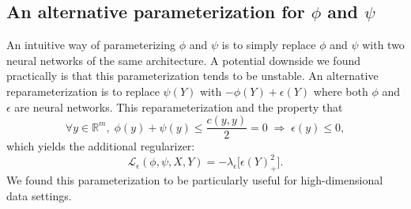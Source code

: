 \documentclass[runningheads]{llncs}
\begin{document}
\subsection{An alternative parameterization for $\phi$ and $\psi$}
\label{sec:parametrization_details}
An intuitive way of parameterizing $\phi$ and $\psi$ is to simply replace $\phi$ and $\psi$ with two neural networks of the same architecture. A potential downside we found practically is that this parameterization tends to be unstable. An alternative reparameterization is to replace $\psi(Y)$ with $-\phi(Y) + \epsilon(Y)$ where both $\phi$ and $\epsilon$ are neural networks. This reparameterization and the property that 
$$\forall y \in \mathds{R}^m, \; \phi(y) + \psi(y) \leq \frac{c(y,y)}{2}= 0 \; \Longrightarrow \; \epsilon(y)\leqslant 0,$$ which yields the additional regularizer:
\begin{equation}
    \mathcal{L}_{\epsilon}(\phi, \psi, X, Y) = -\lambda_{\epsilon}\bigg[\epsilon(Y)_+^2\bigg]\label{addition}.
\end{equation}
We found this parameterization to be particularly useful for high-dimensional data settings.
\end{document}
